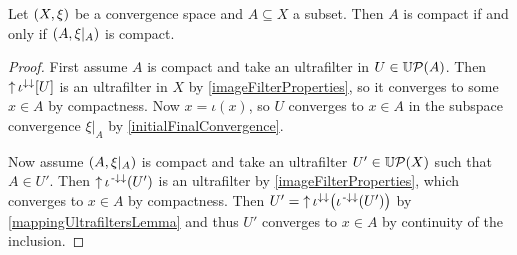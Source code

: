 \begin{lemma} \label{compactSetCompactSubspace}
Let $\left( X,\xi \right)$ be a convergence space and $A\subseteq X$ a subset. Then $A$ is compact \textup{if and only if} $\left( A, \xi|_A \right)$ is compact.
\end{lemma}
\begin{proof}
First assume $A$ is compact and take an ultrafilter in $U\in \operatorname{\mathbb{U}\mathcal{P}}(A)$. Then $\operatorname{\uparrow} \iota^{\downarrow\downarrow}[U]$ is an ultrafilter in $X$ by \ref{imageFilterProperties}, so it converges to some $x\in A$ by compactness. Now $x = \iota(x)$, so $U$ converges to $x\in A$ in the subspace convergence $\xi|_A$ by \ref{initialFinalConvergence}.

Now assume $\left( A, \xi|_A \right)$ is compact and take an ultrafilter $U'\in \operatorname{\mathbb{U}\mathcal{P}}(X)$ such that $A\in U'$. Then $\operatorname{\uparrow} \iota^{{\text{\hspace{0.15em}-}\downarrow}\downarrow}(U')$ is an ultrafilter by \ref{imageFilterProperties}, which converges to $x\in A$ by compactness. Then $U' = \operatorname{\uparrow}\iota^{\downarrow\downarrow}\big(\iota^{{\text{\hspace{0.15em}-}\downarrow}\downarrow}(U')\big)$ by \ref{mappingUltrafiltersLemma} and thus $U'$ converges to $x\in A$ by continuity of the inclusion.
\end{proof}


